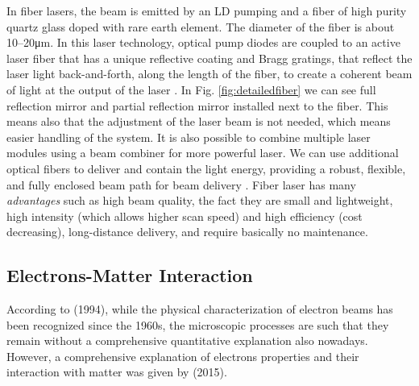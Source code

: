 In fiber lasers, the beam is emitted by an LD pumping and a fiber of high purity  quartz glass doped with  rare earth element. The diameter of the fiber is about \numrange[range-phrase=--]{10}{20}\unit{\micro\metre}. In this laser technology, optical pump diodes are coupled to an active laser fiber that has a unique reflective coating and Bragg gratings, that reflect the laser light back-and-forth, along the length of the fiber, to create a coherent beam of light at the output of the laser \cite{milewski_additive_2017}. In Fig. \ref{fig:detailedfiber} we can see full reflection mirror and partial reflection mirror installed next to the fiber. This means also that the adjustment of the laser beam is not needed, which means easier handling of the system. It is also possible to combine multiple laser modules using a beam combiner for more powerful laser. We can use additional optical fibers to deliver and contain the light energy, providing a robust, flexible, and fully enclosed beam path for beam delivery \cite{milewski_additive_2017}. Fiber laser has many \textit{advantages} such as high beam quality, the fact they are small and lightweight, high intensity (which allows higher scan speed) and high efficiency (cost decreasing), long-distance delivery, and require basically no maintenance. 
\subsection{Electrons-Matter Interaction}
\label{subsec:ebminter}
According to \citeauthor{schultz_h_electron_1994} (1994), while the physical characterization of electron beams has been recognized since the 1960s, the microscopic processes are such that they remain without a comprehensive quantitative explanation also nowadays. However, a comprehensive explanation of electrons properties and their interaction with matter was given by \citeauthor{krumeich_properties_2015} (2015).
